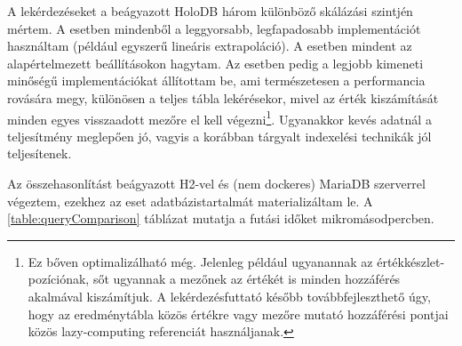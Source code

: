 \documentclass[
    parspace,
    noindent,
    nohyp,
]{elteiktdk}[2023/04/10]
\newcommand{\textbftt}[1]{{\fontfamily{lmtt}\fontseries{b}\selectfont{#1}}}
\begin{document}
A lekérdezéseket a beágyazott HoloDB három különböző skálázási szintjén mértem.
A \textbftt{MIN} esetben mindenből a leggyorsabb, legfapadosabb implementációt használtam
(például egyszerű lineáris extrapoláció).
A \textbftt{DEF} esetben mindent az alapértelmezett beállításokon hagytam.
Az \textbftt{EXT} esetben pedig a legjobb kimeneti minőségű implementációkat állítottam be,
ami természetesen a performancia rovására megy,
különösen a teljes tábla lekérésekor,
mivel az érték kiszámítását minden egyes visszaadott mezőre el kell végezni\footnote{
  Ez bőven optimalizálható még.
  Jelenleg például ugyanannak az értékkészlet-pozíciónak, sőt ugyannak a mezőnek
  az értékét is minden hozzáférés akalmával kiszámítjuk.
  A lekérdezésfuttató később továbbfejleszthető úgy,
  hogy az eredménytábla közös értékre vagy mezőre mutató hozzáférési pontjai
  közös lazy-computing referenciát használjanak.
}.
Ugyanakkor kevés adatnál a teljesítmény meglepően jó,
vagyis a korábban tárgyalt indexelési technikák jól teljesítenek.

Az összehasonlítást beágyazott H2-vel és (nem dockeres) MariaDB szerverrel végeztem,
ezekhez az \textbftt{EXT} eset adatbázistartalmát materializáltam le.
A \ref{table:queryComparison} táblázat mutatja a futási időket mikromásodpercben.
\end{document}
